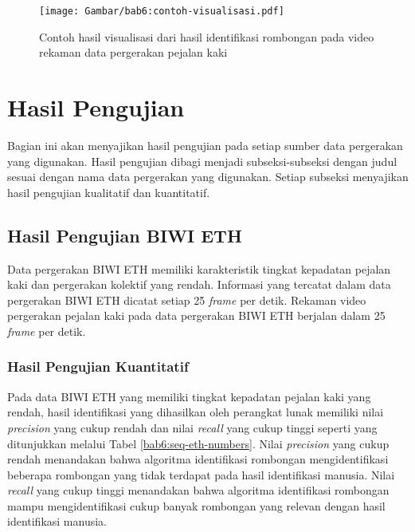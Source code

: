 \begin{figure}[h]
    \centering
    \captionsetup{width=0.8\textwidth}
    \texttt{[image: Gambar/bab6:contoh-visualisasi.pdf]}
    \caption[Contoh hasil visualisasi rombongan]{Contoh hasil visualisasi dari hasil identifikasi rombongan pada video rekaman data pergerakan pejalan kaki}
    \label{bab6:contoh-visualisasi}
\end{figure}

\section{Hasil Pengujian}
\label{sec:result}

Bagian ini akan menyajikan hasil pengujian pada setiap sumber data pergerakan yang digunakan. Hasil pengujian dibagi menjadi subseksi-subseksi dengan judul sesuai dengan nama data pergerakan yang digunakan. Setiap subseksi menyajikan hasil pengujian kualitatif dan kuantitatif.

\subsection{Hasil Pengujian BIWI ETH}
\label{subsec:eth-result}

Data pergerakan BIWI ETH memiliki karakteristik tingkat kepadatan pejalan kaki dan pergerakan kolektif yang rendah. Informasi yang tercatat dalam data pergerakan BIWI ETH dicatat setiap 2\.5 \textit{frame} per detik. Rekaman video pergerakan pejalan kaki pada data pergerakan BIWI ETH berjalan dalam 25 \textit{frame} per detik.

\subsubsection{Hasil Pengujian Kuantitatif}
\label{subsubsec:eth-quantitative}

Pada data BIWI ETH yang memiliki tingkat kepadatan pejalan kaki yang rendah, hasil identifikasi yang dihasilkan oleh perangkat lunak memiliki nilai \textit{precision} yang cukup rendah dan nilai \textit{recall} yang cukup tinggi seperti yang ditunjukkan melalui Tabel \ref{bab6:seq-eth-numbers}. Nilai \textit{precision} yang cukup rendah menandakan bahwa algoritma identifikasi rombongan mengidentifikasi beberapa rombongan yang tidak terdapat pada hasil identifikasi manusia. Nilai \textit{recall} yang cukup tinggi menandakan bahwa algoritma identifikasi rombongan mampu
mengidentifikasi cukup banyak rombongan yang relevan dengan hasil identifikasi manusia.

